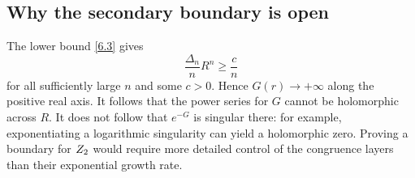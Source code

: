 \subsection{Why the secondary boundary is open}

The lower bound \eqref{6.3} gives
\[
 \frac{\Delta_n}{n}R^n\ge \frac{c}{n}
\]
for all sufficiently large \(n\) and some \(c>0\).  Hence
\(G(r)\to+\infty\) along the positive real axis.  It follows that the power
series for \(G\) cannot be holomorphic across \(R\).  It does not follow that
\(e^{-G}\) is singular there: for example, exponentiating a logarithmic
singularity can yield a holomorphic zero.  Proving a boundary for \(Z_{2}\)
would require more detailed control of the congruence layers than their
exponential growth rate.
